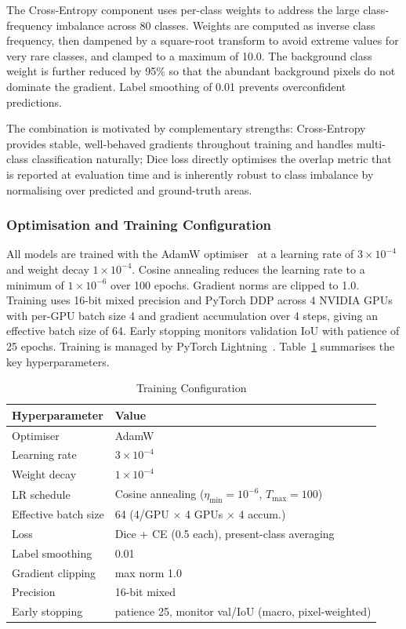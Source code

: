 \documentclass[a4paper,11pt]{article}
\begin{document}
The Cross-Entropy component uses per-class weights to address the large class-frequency
imbalance across 80 classes. Weights are computed as inverse class frequency, then
dampened by a square-root transform to avoid extreme values for very rare classes, and
clamped to a maximum of 10.0. The background class weight is further reduced by 95\% so
that the abundant background pixels do not dominate the gradient. Label smoothing of 0.01
prevents overconfident predictions.

The combination is motivated by complementary strengths: Cross-Entropy provides stable,
well-behaved gradients throughout training and handles multi-class classification
naturally; Dice loss directly optimises the overlap metric that is reported at evaluation
time and is inherently robust to class imbalance by normalising over predicted and
ground-truth areas.

\subsubsection{Optimisation and Training Configuration}

All models are trained with the AdamW optimiser~\cite{loshchilov2019} at a learning rate
of $3 \times 10^{-4}$ and weight decay $1 \times 10^{-4}$. Cosine annealing reduces the
learning rate to a minimum of $1 \times 10^{-6}$ over 100 epochs. Gradient norms are
clipped to 1.0. Training uses 16-bit mixed precision and PyTorch DDP across 4 NVIDIA GPUs
with per-GPU batch size 4 and gradient accumulation over 4 steps, giving an effective
batch size of 64. Early stopping monitors validation IoU with patience of 25 epochs.
Training is managed by PyTorch Lightning~\cite{falcon2019}. Table~\ref{tab:training_config}
summarises the key hyperparameters.

\begin{table}[H]
\centering
\caption{Training Configuration}
\label{tab:training_config}
\begin{tabular}{ll}
\toprule
\textbf{Hyperparameter} & \textbf{Value} \\
\midrule
Optimiser            & AdamW \\
Learning rate        & $3 \times 10^{-4}$ \\
Weight decay         & $1 \times 10^{-4}$ \\
LR schedule          & Cosine annealing ($\eta_{\min} = 10^{-6}$, $T_{\max} = 100$) \\
Effective batch size & 64 (4/GPU $\times$ 4 GPUs $\times$ 4 accum.) \\
Loss                 & Dice + CE (0.5 each), present-class averaging \\
Label smoothing      & 0.01 \\
Gradient clipping    & max norm 1.0 \\
Precision            & 16-bit mixed \\
Early stopping       & patience 25, monitor val/IoU (macro, pixel-weighted) \\
\bottomrule
\end{tabular}
\end{table}
\end{document}
